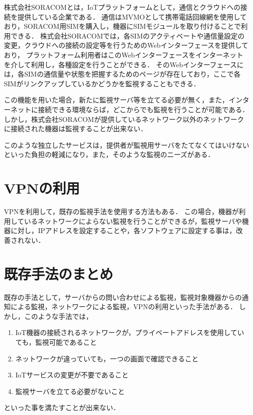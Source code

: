 	株式会社SORACOMとは，IoTプラットフォームとして，通信とクラウドへの接続を提供している企業である．
	通信はMVMOとして携帯電話回線網を使用しており，SORACOM用SIMを購入し，機器にSIMモジュールを取り付けることで利用できる．
	株式会社SORACOMでは，各SIMのアクティベートや通信量設定の変更，クラウドへの接続の設定等を行うためのWebインターフェースを提供しており，
	プラットフォーム利用者はこのWebインターフェースをインターネットを介して利用し，各種設定を行うことができる．
	そのWebインターフェースには，各SIMの通信量や状態を把握するためのページが存在しており，ここで各SIMがリンクアップしているかどうかを監視することもできる．

	この機能を用いた場合，新たに監視サーバ等を立てる必要が無く，また，インターネットに接続できる環境ならば，どこからでも監視を行うことが可能である．
	しかし，株式会社SORACOMが提供しているネットワーク以外のネットワークに接続された機器は監視することが出来ない．

	このような独立したサービスは，提供者が監視用サーバをたてなくてはいけないといった負担の軽減になり，また，そのような監視のニーズがある．

\section{VPNの利用}
	VPNを利用して，既存の監視手法を使用する方法もある．
	この場合，機器が利用しているネットワークによらない監視を行うことができるが，監視サーバや機器に対し，IPアドレスを設定することや，各ソフトウェアに設定する事は，改善されない．

\section{既存手法のまとめ}
	既存の手法として，サーバからの問い合わせによる監視，監視対象機器からの通知による監視，ネットワークによる監視，VPNの利用といった手法がある．
	しかし，このような手法では，
	\begin{enumerate}
		\item IoT機器の接続されるネットワークが，プライベートアドレスを使用していても，監視可能であること
		\item ネットワークが違っていても，一つの画面で確認できること
		\item IoTサービスの変更が不要であること
		\item 監視サーバを立てる必要がないこと
	\end{enumerate}
	といった事を満たすことが出来ない．

